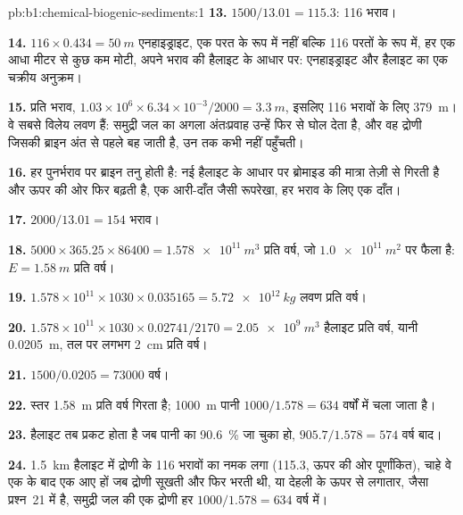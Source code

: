 \begin{solution}{pb:b1:chemical-biogenic-sediments:1}
\textbf{13.} $1500/13.01 = 115.3$: 116 भराव।

\textbf{14.} $116\times0.434 = \qty{50}{m}$ एनहाइड्राइट, एक परत के रूप में नहीं बल्कि 116 परतों के रूप में, हर एक आधा मीटर से कुछ कम मोटी, अपने भराव की हैलाइट के आधार पर: एनहाइड्राइट और हैलाइट का एक चक्रीय अनुक्रम।

\textbf{15.} प्रति भराव, $1.03\times10^6\times6.34\times10^{-3}/2000 =
\qty{3.3}{m}$, इसलिए 116 भरावों के लिए \qty{379}{m}। वे सबसे विलेय लवण हैं: समुद्री जल का अगला अंतःप्रवाह उन्हें फिर से घोल देता है, और वह द्रोणी जिसकी ब्राइन अंत से पहले बह जाती है, उन तक कभी नहीं पहुँचती।

\textbf{16.} हर पुनर्भराव पर ब्राइन तनु होती है: नई हैलाइट के आधार पर ब्रोमाइड की मात्रा तेज़ी से गिरती है और ऊपर की ओर फिर बढ़ती है, एक आरी-दाँत जैसी रूपरेखा, हर भराव के लिए एक दाँत।

\textbf{17.} $2000/13.01 = 154$ भराव।

\textbf{18.} $5000\times365.25\times86400 = \qty{1.578e11}{m^3}$ प्रति वर्ष, जो $\qty{1.0e11}{m^2}$ पर फैला है: $E = \qty{1.58}{m}$ प्रति वर्ष।

\textbf{19.} $1.578\times10^{11}\times1030\times0.035165 = \qty{5.72e12}{kg}$ लवण प्रति वर्ष।

\textbf{20.} $1.578\times10^{11}\times1030\times0.02741/2170 =
\qty{2.05e9}{m^3}$ हैलाइट प्रति वर्ष, यानी \qty{0.0205}{m}, तल पर लगभग \qty{2}{cm} प्रति वर्ष।

\textbf{21.} $1500/0.0205 = \num{73000}$ वर्ष।

\textbf{22.} स्तर \qty{1.58}{m} प्रति वर्ष गिरता है; \qty{1000}{m} पानी $1000/1.578 = 634$ वर्षों में चला जाता है।

\textbf{23.} हैलाइट तब प्रकट होता है जब पानी का \qty{90.6}{\%} जा चुका हो, $905.7/1.578 = 574$ वर्ष बाद।

\textbf{24.} \qty{1.5}{km} हैलाइट में द्रोणी के 116 भरावों का नमक लगा (115.3, ऊपर की ओर पूर्णांकित), चाहे वे एक के बाद एक आए हों जब द्रोणी सूखती और फिर भरती थी, या देहली के ऊपर से लगातार, जैसा प्रश्न~21 में है, समुद्री जल की एक द्रोणी हर $1000/1.578 = 634$ वर्ष में।
\end{solution}
